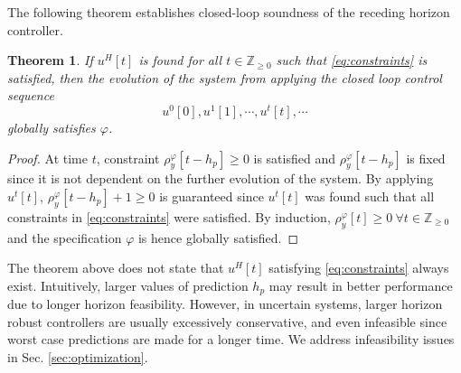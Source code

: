 \documentclass[letterpaper, 10 pt, conference]{ieeeconf}
\newtheorem{theorem}{Theorem}
\begin{document}
The following theorem establishes closed-loop soundness of the receding horizon controller. 
\begin{theorem}
If ${u}^H[t]$ is found for all $t\in \mathbb{Z}_{\geq 0}$ such that \eqref{eq:constraints} is satisfied, then the evolution of the system from applying the closed loop control sequence
\begin{equation*}
u^0[0],u^1[1], \cdots, u^t[t],\cdots
\end{equation*}
globally satisfies $\varphi$. 
\end{theorem}
\begin{proof}
At time $t$, constraint $\rho_y^\varphi[t-h_p] \geq 0$ is satisfied and $\rho_y^\varphi[t-h_p]$ is fixed since it is not dependent on the further evolution of the system. 
By applying $u^t[t]$, $\rho_y^\varphi[t-h_p]+1 \geq 0$ is guaranteed since $u^t[t]$ was found such that all constraints in  \eqref{eq:constraints} were satisfied. By induction,  $\rho_y^\varphi[t] \geq 0 ~  \forall t \in  \mathbb{Z}_{\geq 0}$ and the specification $\varphi$ is hence globally satisfied.
\end{proof}
The theorem above does not state that $u^H[t]$ satisfying \eqref{eq:constraints} always exist. Intuitively, larger values of prediction $h_p$ may result in better performance due to longer horizon feasibility. However, in uncertain systems, larger horizon robust controllers are usually excessively conservative, and even infeasible since worst case predictions are made for a longer time. We address infeasibility issues in Sec. \ref{sec:optimization}.
\end{document}
